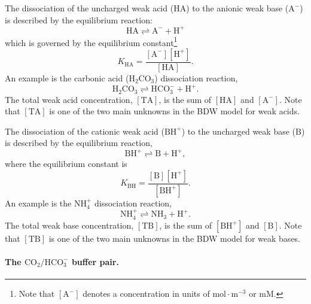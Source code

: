 \documentclass[fleqn,10pt]{physiome}
\begin{document}
The dissociation of the uncharged weak acid ($\mathrm{HA}$) to the anionic weak base ($\mathrm{A^-}$) is described by the equilibrium reaction:
\begin{equation}
\mathrm{HA \rightleftharpoons A^- + H^+}
\end{equation}
which is governed by the equilibrium constant\footnote{Note that $\mathrm{[A^-]}$ denotes a concentration in units of $\mathrm{mol\cdot m^{-3}}$ or $\mathrm{mM}$.}
\begin{equation}
K_\mathrm{HA}=\dfrac{\mathrm{[A^-][H^+]}}{\mathrm{[HA]}}.
\label{eqn:K_A}
\end{equation}
An example is the carbonic acid ($\mathrm{H_2CO_3}$) dissociation reaction,
\begin{equation*}
\mathrm{H_2CO_3 \rightleftharpoons HCO_3^- + H^+}.
\end{equation*}
The total weak acid concentration, $\mathrm{[TA]}$, is the sum of $\mathrm{[HA]}$ and $\mathrm{[A^-]}$. Note that $\mathrm{[TA]}$ is one of the two main unknowns in the BDW model for weak acids.

The dissociation of the cationic weak acid ($\mathrm{BH^+}$) to the uncharged weak base ($\mathrm{B}$) is described by the equilibrium reaction,
\begin{equation}
\mathrm{BH^+ \rightleftharpoons B + H^+},
\end{equation}
where the equilibrium constant is
\begin{equation}
K_\mathrm{BH}=\dfrac{\mathrm{[B][H^+]}}{\mathrm{[BH^+]}}.
\end{equation}
An example is the $\mathrm{NH_4^+}$ dissociation reaction,
\begin{equation*}
\mathrm{NH_4^+ \rightleftharpoons NH_3 + H^+}.
\end{equation*}
The total weak base concentration, $\mathrm{[TB]}$, is the sum of $\mathrm{[BH^+]}$ and $\mathrm{[B]}$. Note that $\mathrm{[TB]}$ is one of the two main unknowns in the BDW model for weak bases.

\paragraph{The $\mathrm{CO_2}/\mathrm{HCO_3^-}$ buffer pair.}
\end{document}
